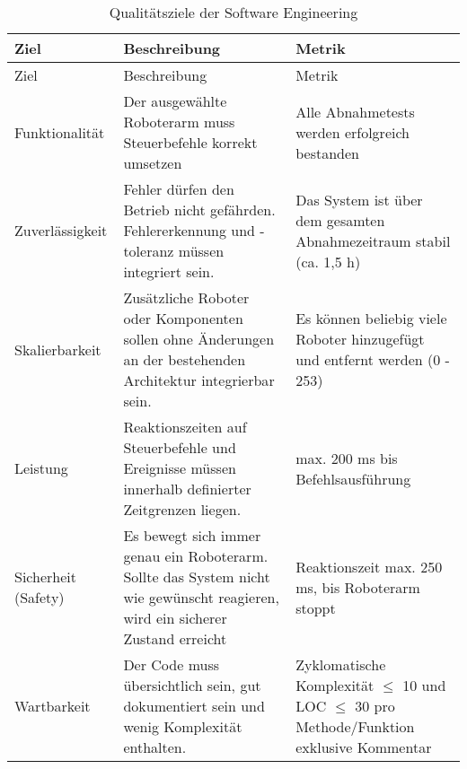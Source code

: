 \begin{longtable}{|>{\raggedright\arraybackslash}p{4cm}|>{\raggedright\arraybackslash}p{5cm}|>{\raggedright\arraybackslash}p{5cm}|}
	\caption{Qualitätsziele der Software Engineering} \label{tab:seziele} \\
	\hline
	Ziel & Beschreibung & Metrik \\
	\hline
	\endfirsthead
	
	\hline
	Ziel & Beschreibung & Metrik \\
	\hline
	\endhead
	
	\hline
	\endfoot
   
        Funktionalität &  
        Der ausgewählte Roboterarm muss Steuerbefehle korrekt umsetzen
        & Alle Abnahmetests werden erfolgreich bestanden
        \\
        \hline
        Zuverlässigkeit & 
        Fehler dürfen den Betrieb nicht gefährden. Fehlererkennung und -toleranz müssen integriert sein.
        & Das System ist über dem gesamten Abnahmezeitraum stabil (ca. 1,5 h)
        \\
        \hline
        Skalierbarkeit & 
        Zusätzliche Roboter oder Komponenten sollen ohne Änderungen an der bestehenden Architektur integrierbar sein. 
        & Es können beliebig viele Roboter hinzugefügt und entfernt werden (0 - 253)
        \\
        \hline
        Leistung & 
        Reaktionszeiten auf Steuerbefehle und Ereignisse müssen innerhalb definierter Zeitgrenzen liegen. 
        & max. 200 ms bis Befehlsausführung
        \\
        \hline
        Sicherheit (Safety) & 
        Es bewegt sich immer genau ein Roboterarm. Sollte das System nicht wie gewünscht reagieren, wird ein sicherer Zustand erreicht
        & Reaktionszeit max. 250 ms, bis Roboterarm stoppt
        \\
        \hline
        Wartbarkeit & 
        Der Code muss übersichtlich sein, gut dokumentiert sein und wenig Komplexität enthalten. 
        & Zyklomatische Komplexität $\leq$ 10 und LOC $\leq$ 30 pro Methode/Funktion exklusive Kommentar  
        

\end{longtable}
